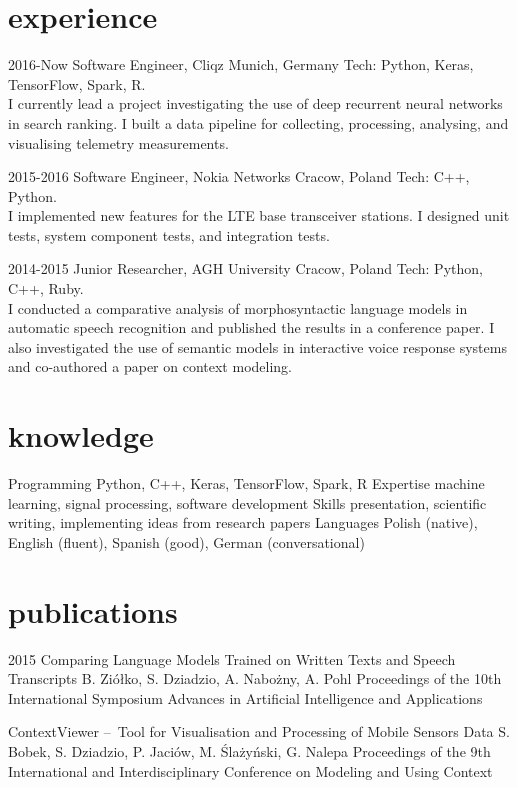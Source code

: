 \documentclass[]{friggeri-cv_osx}
\begin{document}
\section{experience}
\begin{entrylist}
\entry
{2016-Now}
{Software Engineer, Cliqz}
{Munich, Germany}
{Tech: Python, Keras, TensorFlow, Spark, R.\\I currently lead a project investigating the use of deep recurrent neural networks in search ranking. I built a data pipeline for collecting, processing, analysing, and visualising telemetry measurements.\\}

\entry
{2015-2016}
{Software Engineer, Nokia Networks}
{Cracow, Poland}
{Tech: C++, Python.\\I implemented new features for the LTE base transceiver stations. I designed unit tests, system component tests, and integration tests.\\}

\entry
{2014-2015}
{Junior Researcher, AGH University}
{Cracow, Poland}
{Tech: Python, C++, Ruby.\\I conducted a comparative analysis of morphosyntactic language models in automatic speech recognition and published the results in a conference paper. I also investigated the use of semantic models in interactive voice response systems and co-authored a paper on context modeling.\\}
\end{entrylist}


\section{knowledge}
\begin{entrylist}
\entry
{}
{Programming}
{}
{Python, C++, Keras, TensorFlow, Spark, R}
\entry
{}
{Expertise}
{}
{machine learning, signal processing, software development}
\entry
{}
{Skills}
{}
{presentation, scientific writing, implementing ideas from research papers}
\entry
{}
{Languages}
{}
{Polish (native), English (fluent), Spanish (good), German (conversational)}
\end{entrylist}


\section{publications}
\begin{entrylist}
\entry
{2015}
{Comparing Language Models Trained on Written Texts and Speech Transcripts}
{B. Ziółko, S. Dziadzio, A. Nabożny, A. Pohl}
{Proceedings of the 10th International Symposium Advances in Artificial Intelligence and Applications\\}

\entry
{}
{ContextViewer – Tool for Visualisation and Processing of Mobile Sensors Data}
{S. Bobek, S. Dziadzio, P. Jaciów, M. Ślażyński, G. Nalepa}
{Proceedings of the 9th International and Interdisciplinary Conference on Modeling and Using Context\\\\}
\end{entrylist}
\end{document}
